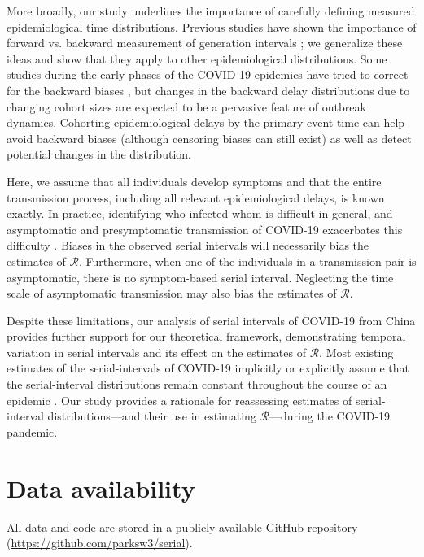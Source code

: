 \documentclass[12pt]{article}
\newcommand{\RR}{\ensuremath{{\mathcal R}}\xspace}
\begin{document}
More broadly, our study underlines the importance of carefully defining measured epidemiological time distributions. 
Previous studies have shown the importance of forward vs. backward
measurement of generation intervals \citep{nishiura2010time,champredon2015intrinsic,britton2019estimation};
we generalize these ideas and show that they apply to other epidemiological distributions.
Some studies during the early phases of the COVID-19 epidemics have tried to correct for the backward biases \citep{verity2020estimates}, but changes in the backward delay distributions due to changing cohort sizes are expected to be a pervasive feature of outbreak dynamics.
Cohorting epidemiological delays by the primary event time can help avoid backward biases (although censoring biases can still exist) as well as detect potential changes in the distribution.

Here, we assume that all individuals develop symptoms and that the entire transmission process, including all relevant epidemiological delays, is known exactly.
In practice, identifying who infected whom is difficult in general, and asymptomatic and presymptomatic transmission of COVID-19 exacerbates this difficulty \citep{bai2020presumed,he2020temporal,wei2020presymptomatic}.
Biases in the observed serial intervals will necessarily bias the estimates of \RR. 
Furthermore, when one of the individuals in a transmission pair is asymptomatic, there is no symptom-based serial interval.
Neglecting the time scale of asymptomatic transmission may also bias the estimates of \RR \citep{park2020time}.

Despite these limitations, our analysis of serial intervals of COVID-19 from China provides further support for our theoretical framework, demonstrating temporal variation in serial intervals and its effect on the estimates of \RR.
Most existing estimates of the serial-intervals of COVID-19 implicitly or explicitly assume that the serial-interval distributions remain constant throughout the course of an epidemic \citep{du2020serial, he2020temporal, nishiura2020serial,tindale2020transmission,zhao2020estimating,zhang2020evolving}.
Our study provides a rationale for reassessing estimates of
serial-interval distributions---and their use in estimating
\RR---during the COVID-19 pandemic.

\section*{Data availability}

All data and code are stored in a publicly available GitHub repository (\url{https://github.com/parksw3/serial}).
\end{document}
